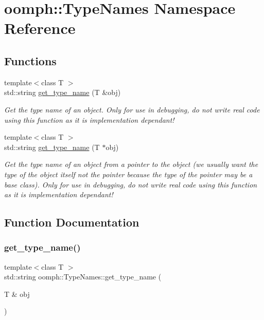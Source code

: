 \hypertarget{namespaceoomph_1_1TypeNames}{}\section{oomph\+:\+:Type\+Names Namespace Reference}
\label{namespaceoomph_1_1TypeNames}
\subsection*{Functions}
\begin{DoxyCompactItemize}
\item 
{\footnotesize template$<$class T $>$ }\\std\+::string \hyperlink{namespaceoomph_1_1TypeNames_aa1ac15f9594d19e6dab530390ecf1e79}{get\+\_\+type\+\_\+name} (T \&obj)
\begin{DoxyCompactList}\small\item\em Get the type name of an object. Only for use in debugging, do not write real code using this function as it is implementation dependant! \end{DoxyCompactList}\item 
{\footnotesize template$<$class T $>$ }\\std\+::string \hyperlink{namespaceoomph_1_1TypeNames_ab0532785ab096d82cdec476b948da06f}{get\+\_\+type\+\_\+name} (T $\ast$obj)
\begin{DoxyCompactList}\small\item\em Get the type name of an object from a pointer to the object (we usually want the type of the object itself not the pointer because the type of the pointer may be a base class). Only for use in debugging, do not write real code using this function as it is implementation dependant! \end{DoxyCompactList}\end{DoxyCompactItemize}


\subsection{Function Documentation}
\mbox{\label{namespaceoomph_1_1TypeNames_aa1ac15f9594d19e6dab530390ecf1e79}} 
\subsubsection{\texorpdfstring{get\+\_\+type\+\_\+name()}{get\_type\_name()}\hspace{0.1cm}{\footnotesize\ttfamily [1/2]}}
{\footnotesize\ttfamily template$<$class T $>$ \\
std\+::string oomph\+::\+Type\+Names\+::get\+\_\+type\+\_\+name (\begin{DoxyParamCaption}\item[{T \&}]{obj }\end{DoxyParamCaption})}



